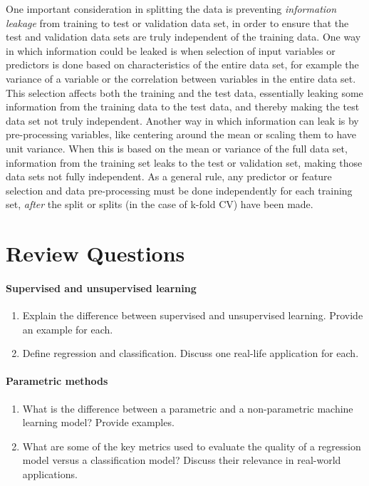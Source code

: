 One important consideration in splitting the data is preventing \emph{information leakage} from training to test or validation data set, in order to ensure that the test and validation data sets are truly independent of the training data. One way in which information could be leaked is when selection of input variables or predictors is done based on characteristics of the entire data set, for example the variance of a variable or the correlation between variables in the entire data set. This selection affects both the training and the test data, essentially leaking some information from the training data to the test data, and thereby making the test data set not truly independent. Another way in which information can leak is by pre-processing variables, like centering around the mean or scaling them to have unit variance. When this is based on the mean or variance of the full data set, information from the training set leaks to the test or validation set, making those data sets not fully independent. As a general rule, any predictor or feature selection and data pre-processing must be done independently for each training set, \emph{after} the split or splits (in the case of k-fold CV) have been made. 

\section{Review Questions}
\paragraph*{Supervised and unsupervised learning}
\begin{enumerate}[nosep]
    \item Explain the difference between supervised and unsupervised learning. Provide an example for each.
    \item Define regression and classification. Discuss one real-life application for each.
\end{enumerate}
\paragraph*{Parametric methods}
\begin{enumerate}
    \item What is the difference between a parametric and a non-parametric machine learning model? Provide examples.
    \item What are some of the key metrics used to evaluate the quality of a regression model versus a classification model? Discuss their relevance in real-world applications.
\end{enumerate}
